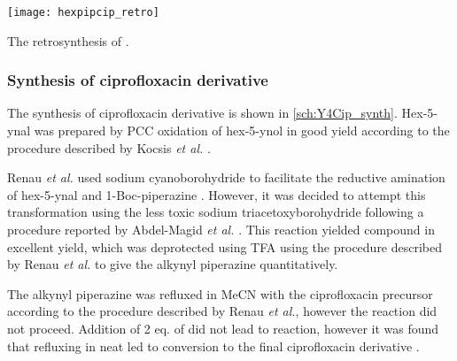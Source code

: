 
\begin{scheme}[H]
	\begin{center}
		\texttt{[image: hexpipcip\_retro]}
		\caption{The retrosynthesis of . \label{sch:Y4Cip_retro}}
	\end{center}
\end{scheme}

\subsubsection{Synthesis of ciprofloxacin derivative }

The synthesis of ciprofloxacin derivative  is shown in \ref{sch:Y4Cip_synth}. Hex-5-ynal  was prepared by PCC oxidation of hex-5-ynol  in good yield according to the procedure described by Kocsis \textit{et al.} \cite{Kocsis2012}. 

Renau \textit{et al.}\cite{Renau1996} used sodium cyanoborohydride to facilitate the reductive amination of hex-5-ynal  and 1-Boc-piperazine . However, it was decided to attempt this transformation using the less toxic sodium triacetoxyborohydride following a procedure reported by Abdel-Magid \textit{et al.} \cite{Abdel-Magid1996}. This reaction yielded compound  in excellent yield, which was deprotected using TFA using the procedure described by Renau \textit{et al.}\cite{Renau1996} to give the alkynyl piperazine  quantitatively. 

The alkynyl piperazine  was refluxed in MeCN with the ciprofloxacin precursor  according to the procedure described by Renau \textit{et al.}\cite{Renau1996}, however the reaction did not proceed. Addition of 2 eq. of  did not lead to reaction, however it was found that refluxing in neat  led to conversion to the final ciprofloxacin derivative .

